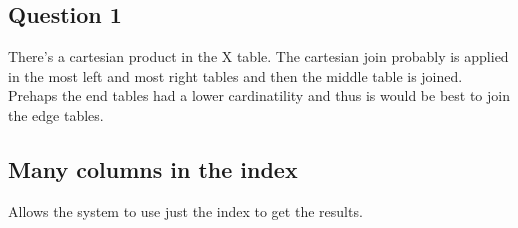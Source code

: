 \subsection{Question 1}  
    There's a cartesian product in the X table. The cartesian join probably is applied in the most left and most right tables and then the middle table is joined. Prehaps the end tables had a lower cardinatility and thus is would be best to join the edge tables. 

\subsection{Many columns in the index}
Allows the system to use just the index to get the results.
